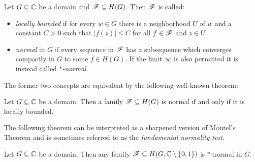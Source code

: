\begin{definition} \label{def:normal-family}
    Let $G \subseteq \mathbb{C}$ be a domain and $\mathscr{F} \subseteq H(G)$. Then $\mathscr{F}$ is called:
    \begin{itemize}
        \item \emph{locally bounded} if for every $w \in G$ there is a neighborhood $U$ of $w$ and a constant $C > 0$ such that $\vert f(z) \vert \leq C$ for all $f \in \mathscr{F}$ and $z \in U$.
        \item \emph{normal} in $G$ if every sequence in $\mathscr{F}$ has a subsequence which converges compactly in $G$ to some $f \in H(G)$. If the limit $\infty$ is also permitted it is instead called \emph{$\ast$-normal}.
    \end{itemize}
\end{definition}

The former two concepts are equivalent by the following well-known theorem:

\begin{theorem}[Montel] \label{thm:montel}
    Let $G \subseteq \mathbb{C}$ be a domain. Then a family $\mathscr{F} \subseteq H(G)$ is normal if and only if it is locally bounded.
\end{theorem}

The following theorem can be interpreted as a sharpened version of Montel's Theorem and is sometimes referred to as the \emph{fundamental normality test}.

\begin{theorem} \label{lem:montel-sharpened}
    Let $G \subseteq \mathbb{C}$ be a domain. Then any family $\mathscr{F} \subseteq H(G, \mathbb{C} \setminus \{ 0, 1 \})$ is $\ast$-normal in $G$.
\end{theorem}

